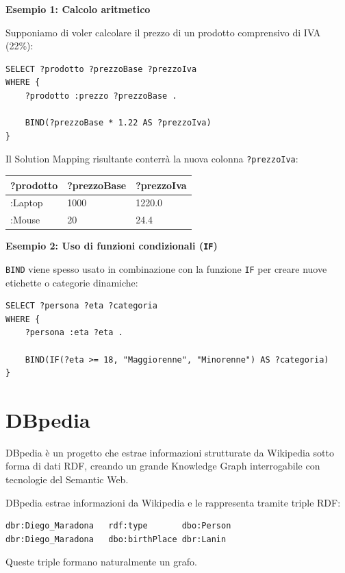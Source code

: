 \textbf{Esempio 1: Calcolo aritmetico}

Supponiamo di voler calcolare il prezzo di un prodotto comprensivo di IVA (22\%):

\begin{verbatim}
SELECT ?prodotto ?prezzoBase ?prezzoIva
WHERE {
    ?prodotto :prezzo ?prezzoBase .
    
    BIND(?prezzoBase * 1.22 AS ?prezzoIva)
}
\end{verbatim}

Il Solution Mapping risultante conterrà la nuova colonna \texttt{?prezzoIva}:

\begin{table}[h!]
\centering
\begin{tabular}{|l|l|l|}
\hline
\textbf{?prodotto} & \textbf{?prezzoBase} & \textbf{?prezzoIva} \\ \hline
:Laptop & 1000 & 1220.0 \\ \hline
:Mouse & 20 & 24.4 \\ \hline
\end{tabular}
\end{table}

\textbf{Esempio 2: Uso di funzioni condizionali (\texttt{IF})}

\texttt{BIND} viene spesso usato in combinazione con la funzione \texttt{IF} per creare nuove etichette o categorie dinamiche:

\begin{verbatim}
SELECT ?persona ?eta ?categoria
WHERE {
    ?persona :eta ?eta .
    
    BIND(IF(?eta >= 18, "Maggiorenne", "Minorenne") AS ?categoria)
}
\end{verbatim}

\section{DBpedia}

DBpedia è un progetto che estrae informazioni strutturate da Wikipedia sotto forma di dati RDF, creando un grande Knowledge Graph interrogabile con tecnologie del Semantic Web.

DBpedia estrae informazioni da Wikipedia e le rappresenta tramite triple RDF:
\begin{lstlisting}
dbr:Diego_Maradona   rdf:type       dbo:Person
dbr:Diego_Maradona   dbo:birthPlace dbr:Lanin
\end{lstlisting}
Queste triple formano naturalmente un grafo.


